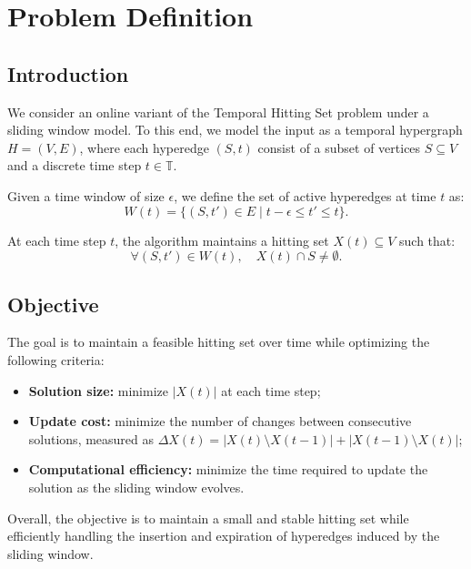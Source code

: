 \section{Problem Definition}

\subsection{Introduction}

We consider an online variant of the Temporal Hitting Set problem under a sliding window model. 
To this end, we model the input as a temporal hypergraph $H = (V, E)$, where each hyperedge $(S, t)$ consist of a subset of vertices $S \subseteq V$ and a discrete time step $t \in \mathbb{T}$.

Given a time window of size $\epsilon$, we define the set of active hyperedges at time $t$ as:
\[
W(t) = \{ (S, t') \in E \mid t - \epsilon \le t' \le t \}.
\]

At each time step $t$, the algorithm maintains a hitting set $X(t) \subseteq V$ such that:
\[
\forall (S, t') \in W(t), \quad X(t) \cap S \neq \emptyset.
\]

\subsection{Objective}

The goal is to maintain a feasible hitting set over time while optimizing the following criteria:

\begin{itemize}
    \item \textbf{Solution size:} minimize $|X(t)|$ at each time step;
    \item \textbf{Update cost:} minimize the number of changes between consecutive solutions, measured as $\Delta X(t) = |X(t) \setminus X(t-1)| + |X(t-1) \setminus X(t)|$; %
    \item \textbf{Computational efficiency:} minimize the time required to update the solution as the sliding window evolves.
\end{itemize}

Overall, the objective is to maintain a small and stable hitting set while efficiently handling the insertion and expiration of hyperedges induced by the sliding window.